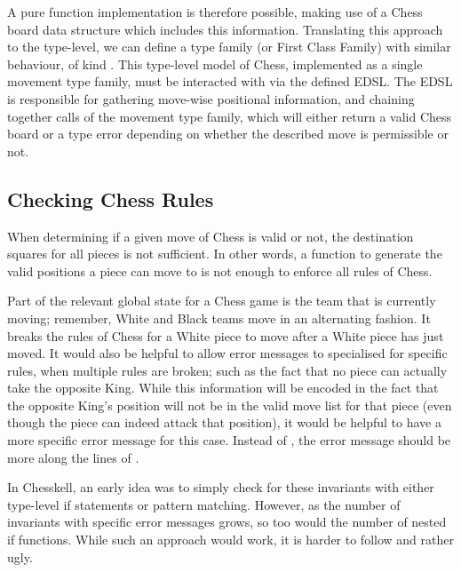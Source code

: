 A pure function implementation is therefore possible, making use of a Chess board data structure which includes this information. Translating this approach to the type-level, we can define a type family (or First Class Family) with similar behaviour, of kind . This type-level model of Chess, implemented as a single movement type family, must be interacted with via the defined EDSL. The EDSL is responsible for gathering move-wise positional information, and chaining together calls of the movement type family, which will either return a valid Chess board or a type error depending on whether the described move is permissible or not.

\subsection{Checking Chess Rules} \label{chessrules}

When determining if a given move of Chess is valid or not, the destination squares for all pieces is not sufficient. In other words, a function to generate the valid positions a piece can move to is not enough to enforce all rules of Chess.

Part of the relevant global state for a Chess game is the team that is currently moving; remember, White and Black teams move in an alternating fashion. It breaks the rules of Chess for a White piece to move after a White piece has just moved. It would also be helpful to allow error messages to specialised for specific rules, when multiple rules are broken; such as the fact that no piece can actually take the opposite King. While this information will be encoded in the fact that the opposite King's position will not be in the valid move list for that piece (even though the piece can indeed attack that position), it would be helpful to have a more specific error message for this case. Instead of , the error message should be more along the lines of .

In Chesskell, an early idea was to simply check for these invariants with either type-level if statements or pattern matching. However, as the number of invariants with specific error messages grows, so too would the number of nested if functions. While such an approach would work, it is harder to follow and rather ugly.

